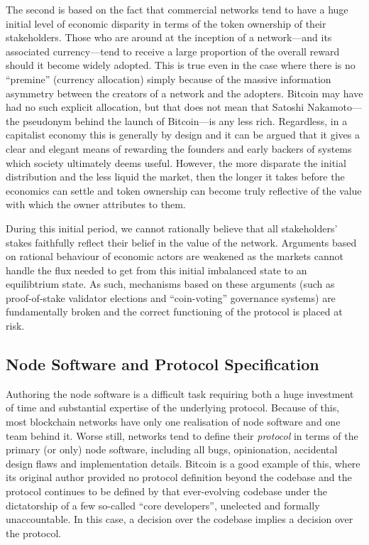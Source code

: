 \documentclass[9pt,oneside]{amsart}
\begin{document}
The second is based on the fact that commercial networks tend to have a huge initial level of economic disparity in terms of the token ownership of their stakeholders. Those who are around at the inception of a network---and its associated currency---tend to receive a large proportion of the overall reward should it become widely adopted. This is true even in the case where there is no ``premine'' (currency allocation) simply because of the massive information asymmetry between the creators of a network and the adopters. Bitcoin may have had no such explicit allocation, but that does not mean that Satoshi Nakamoto---the pseudonym behind the launch of Bitcoin---is any less rich. Regardless, in a capitalist economy this is generally by design and it can be argued that it gives a clear and elegant means of rewarding the founders and early backers of systems which society ultimately deems useful. However, the more disparate the initial distribution and the less liquid the market, then the longer it takes before the economics can settle and token ownership can become truly reflective of the value with which the owner attributes to them.

During this initial period, we cannot rationally believe that all stakeholders' stakes faithfully reflect their belief in the value of the network. Arguments based on rational behaviour of economic actors are weakened as the markets cannot handle the flux needed to get from this initial imbalanced state to an equilibtrium state. As such, mechanisms based on these arguments (such as proof-of-stake validator elections and ``coin-voting'' governance systems) are fundamentally broken and the correct functioning of the protocol is placed at risk.

\subsection{Node Software and Protocol Specification}

Authoring the node software is a difficult task requiring both a huge investment of time and substantial expertise of the underlying protocol. Because of this, most blockchain networks have only one realisation of node software and one team behind it. Worse still, networks tend to define their \emph{protocol} in terms of the primary (or only) node software, including all bugs, opinionation, accidental design flaws and implementation details. Bitcoin is a good example of this, where its original author provided no protocol definition beyond the codebase and the protocol continues to be defined by that ever-evolving codebase under the dictatorship of a few so-called ``core developers'', unelected and formally unaccountable. In this case, a decision over the codebase implies a decision over the protocol.
\end{document}
